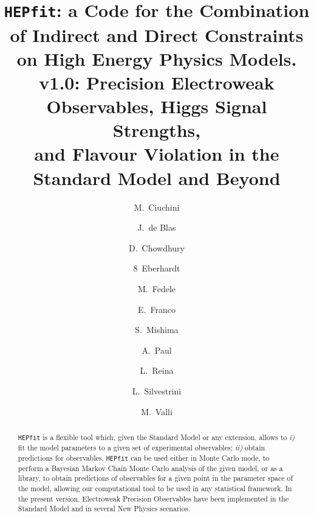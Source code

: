 \documentclass[aps,superscriptaddress,nofootinbib,floatfix,notitlepage]{revtex4-1}
\newcommand{\HEPfit}{\texttt{HEPfit}\xspace}
\begin{document}
\title{\HEPfit: a Code for the Combination of Indirect and Direct
  Constraints\\ on High Energy Physics Models. \\
  v1.0: Precision Electroweak Observables, Higgs Signal Strengths,\\ and Flavour Violation in the
  Standard Model and Beyond
  \vspace*{0.5cm}
}

\collaboration{
\HEPfit Collaboration
}
\author{M.~Ciuchini}
\author{J.~de Blas}
\author{D.~Chowdhury}
\author{8~Eberhardt}
\author{M.~Fedele}
\author{E.~Franco}
\author{S.~Mishima}
\author{A.~Paul}
\author{L.~Reina}
\author{L.~Silvestrini}
\author{M.~Valli}
\begin{abstract}
\HEPfit is a flexible tool which, given the Standard Model or any extension, allows to \textit{i)} fit the model
parameters to a given set of experimental observables;
\textit{ii)} obtain predictions for observables.
\HEPfit can be used either in Monte Carlo mode, to perform a Bayesian Markov Chain Monte Carlo
analysis of the given model, or as a library, to obtain predictions of
observables for a given point in the parameter space of the model, allowing our computational tool to be used in
any statistical framework. In the present version, Electroweak Precision Observables have been implemented
in the Standard Model and in several New Physics scenarios.


\end{abstract}
 
\end{document}
